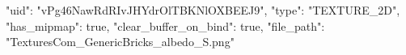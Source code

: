 {
    "uid": "vPg46NawRdRIvJHYdrOlTBKNlOXBEEJ9",
    "type": "TEXTURE_2D",
    "has_mipmap": true,
    "clear_buffer_on_bind": true,
    "file_path": "TexturesCom_GenericBricks_albedo_S.png"
}
